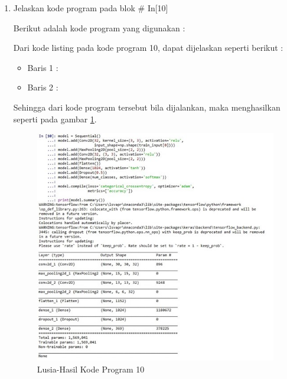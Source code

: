 \begin{enumerate}
\item Jelaskan kode program pada blok \# In[10]
\par Berikut adalah kode program yang digunakan :
	
	\par Dari kode listing pada kode program 10, dapat dijelaskan seperti berikut :
	\begin{itemize}
	\item Baris 1	: 
	\item Baris 2	: 
	\end{itemize}
	\par Sehingga dari kode program tersebut bila dijalankan, maka menghasilkan seperti pada gambar \ref{7B10}.
		\begin{figure}[!hbtp]
		\centering
		\includegraphics[scale=0.5]{figures/w10.jpg}
		\caption{Lusia-Hasil Kode Program 10}
		\label{7B10}
		\end{figure}


\end{enumerate}
